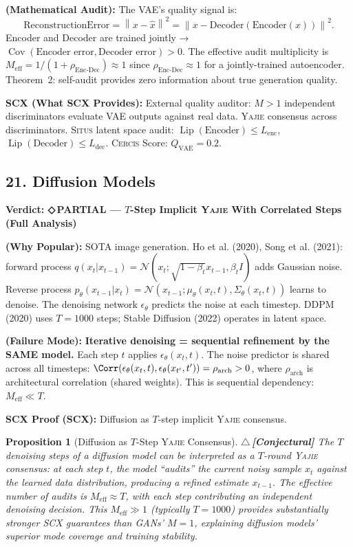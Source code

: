 \documentclass[12pt,a4paper]{article}
\newtheorem{proposition}[theorem]{Proposition}
\theoremstyle{definition}
\newcommand{\rigorConjectural}{{\color{red!70!black}$\triangle$\,\textbf{[Conjectural]}}}
\newcommand{\weakness}{{\color{weakcolor}\textbf{◇\,PARTIAL}}}
\newcommand{\Situs}{\textsc{Situs}}
\newcommand{\Yajie}{\textsc{Yajie}}
\newcommand{\Cercis}{\textsc{Cercis}}
\newcommand{\SCX}{\textsc{SCX}}
\DeclareMathOperator{\Cov}{Cov}
\DeclareMathOperator{\Lip}{Lip}
\newcommand{\cN}{\mathcal{N}}
\newcommand{\norm}[1]{\left\lVert#1\right\rVert}
\newcommand{\auditHeader}[1]{\medskip\noindent\textbf{\large #1}\medskip}
\newcommand{\whyPopular}{\noindent\textbf{ (Why Popular):} }
\newcommand{\whyFail}{\noindent\textbf{ (Failure Mode):} }
\newcommand{\whatMissing}{\noindent\textbf{SCX (What SCX Provides):} }
\newcommand{\mathAudit}{\noindent\textbf{ (Mathematical Audit):} }
\newcommand{\scxProof}{\noindent\textbf{SCX Proof (SCX):} }
\begin{document}
\mathAudit{} The VAE's quality signal is:
\[
\text{ReconstructionError} = \norm{x - \hat{x}}^2 = \norm{x - \text{Decoder}(\text{Encoder}(x))}^2.
\]
Encoder and Decoder are trained jointly → $\Cov(\text{Encoder error}, \text{Decoder error}) > 0$. The effective audit multiplicity is $M_{\text{eff}} = 1/(1 + \rho_{\text{Enc-Dec}}) \approx 1$ since $\rho_{\text{Enc-Dec}} \approx 1$ for a jointly-trained autoencoder. Theorem~2: self-audit provides zero information about true generation quality.

\whatMissing{} External quality auditor: $M>1$ independent discriminators evaluate VAE outputs against real data. \Yajie{} consensus across discriminators. \Situs{} latent space audit: $\Lip(\text{Encoder}) \le L_{\text{enc}}$, $\Lip(\text{Decoder}) \le L_{\text{dec}}$. \Cercis{} Score: $Q_{\text{VAE}} = 0.2$.

\subsection{21. Diffusion Models }

\auditHeader{Verdict: \weakness{} — $T$-Step Implicit \Yajie{} With Correlated Steps (Full Analysis)}

\whyPopular{} SOTA image generation. Ho et al. (2020), Song et al. (2021): forward process $q(x_t|x_{t-1}) = \cN(x_t; \sqrt{1-\beta_t}x_{t-1}, \beta_t I)$ adds Gaussian noise. Reverse process $p_\theta(x_{t-1}|x_t) = \cN(x_{t-1}; \mu_\theta(x_t, t), \Sigma_\theta(x_t, t))$ learns to denoise. The denoising network $\epsilon_\theta$ predicts the noise at each timestep. DDPM (2020) uses $T=1000$ steps; Stable Diffusion (2022) operates in latent space.

\whyFail{} \textbf{Iterative denoising = sequential refinement by the SAME model.} Each step $t$ applies $\epsilon_\theta(x_t, t)$. The noise predictor is shared across all timesteps: $\Corr(\epsilon_\theta(x_t, t), \epsilon_\theta(x_{t'}, t')) = \rho_{\text{arch}} > 0$, where $\rho_{\text{arch}}$ is architectural correlation (shared weights). This is sequential dependency: $M_{\text{eff}} \ll T$.

\scxProof{} Diffusion as $T$-step implicit \Yajie{} consensus.

\begin{proposition}[Diffusion as $T$-Step \Yajie{} Consensus]\label{prop:diffusion_yajie}
\rigorConjectural
The $T$ denoising steps of a diffusion model can be interpreted as a $T$-round \Yajie{} consensus: at each step $t$, the model ``audits'' the current noisy sample $x_t$ against the learned data distribution, producing a refined estimate $x_{t-1}$. The effective number of audits is $M_{\text{eff}} \approx T$, with each step contributing an independent denoising decision. This $M_{\text{eff}} \gg 1$ (typically $T = 1000$) provides substantially stronger \SCX{} guarantees than GANs' $M=1$, explaining diffusion models' superior mode coverage and training stability.
\end{proposition}
\end{document}
